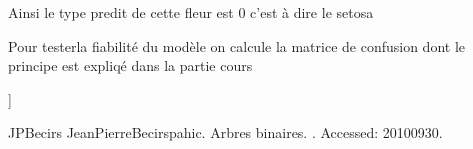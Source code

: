 \documentclass[letterpaper,10pt,english]{jupyterBook}
\begin{document}
\sphinxAtStartPar
Ainsi le type predit de cette fleur est 0 c’est à dire le setosa
\begin{sphinxVerbatimInput}

\begin{sphinxVerbatim}[commandchars=\\\{\}]
\end{sphinxVerbatim}
\end{sphinxVerbatimInput}

\sphinxAtStartPar
Pour testerla fiabilité du modèle on calcule la matrice de confusion dont le principe est expliqé dans la partie cours
\begin{sphinxVerbatimInput}

\begin{sphinxVerbatim}[commandchars=\\\{\}]
\end{sphinxVerbatim}
\end{sphinxVerbatimInput}
\begin{sphinxVerbatimOutput}

\begin{sphinxVerbatim}[commandchars=\\\{\}]
[[40.  0.  0.]
 [ 0. 39.  1.]
 [ 0. 12. 28.]]
\end{sphinxVerbatim}
\end{sphinxVerbatimOutput}

\begin{sphinxthebibliography}{JPBecirs}
\sphinxAtStartPar
Jean\sphinxhyphen{}Pierre\sphinxhyphen{}Becirspahic. Arbres binaires. . Accessed: 2010\sphinxhyphen{}09\sphinxhyphen{}30.
\end{sphinxthebibliography}







\renewcommand{\indexname}{Index}
\printindex
\end{document}

